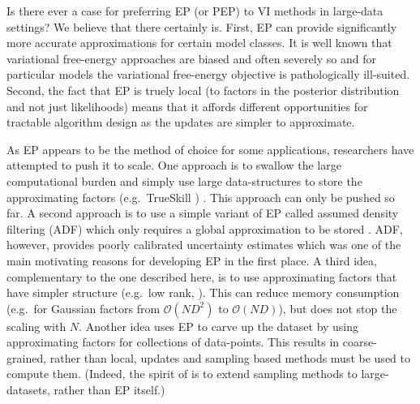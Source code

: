 Is there ever a case for preferring EP (or PEP) to VI methods in large-data settings?  We believe that there certainly is. First, EP can provide significantly more accurate approximations for certain model classes. It is well known that variational free-energy approaches are biased and often severely so \cite{turner+sahani:2011} and for particular models the variational free-energy objective is pathologically ill-suited\cite{cunningham:gaussianEP,turner}. Second, the fact that EP is truely local (to factors in the posterior distribution and not just likelihoods) means that it affords different opportunities for tractable algorithm design as the updates are simpler to approximate.

As EP appears to be the method of choice for some applications, researchers have attempted to push it to scale. One approach is to swallow the large computational burden and simply use large data-structures to store the approximating factors (e.g.~TrueSkill \cite{herbrich:trueskill}) . This approach can only be pushed so far. A second approach is to use a simple variant of EP called assumed density filtering (ADF) which only requires a global approximation to be stored \cite{maybeck:adf}. ADF, however, provides poorly calibrated uncertainty estimates \cite{minka:ep} which was one of the main motivating reasons for developing EP in the first place. 
A third idea, complementary to the one described here, is to use approximating factors that have simpler structure (e.g.~low rank, \cite{qi+minka:sparseGP}). This can reduce memory consumption (e.g.~for Gaussian factors from $\mathcal{O}(ND^2)$ to $\mathcal{O}(ND)$), but does not stop the scaling with $N$. Another idea uses EP to carve up the dataset \cite{gelman:dep,xu:sms} by using approximating factors for collections of data-points. This results in coarse-grained, rather than local, updates and sampling based methods must be used to compute them. (Indeed, the spirit of \cite{gelman:dep,xu:sms} is to extend sampling methods to large-datasets, rather than EP itself.) 

